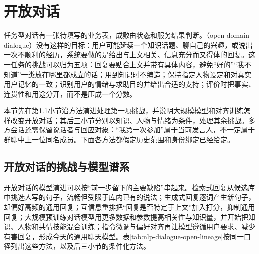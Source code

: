 \section{开放对话}
\label{sec:nlp-dialogue-open}

任务型对话有一张待填写的业务表，成败由状态和服务结果判断。（open-domain dialogue）没有这样的目标：用户可能延续一个知识话题、聊自己的兴趣，或说出一次不顺利的经历，系统要做的是给出与上文相关、信息充分而又得体的回复。这一任务的挑战可以归为五项：回复要贴合上文并带有具体内容，避免“好的”“我不知道”一类放在哪里都成立的话；用到知识时不编造；保持指定人物设定和对真实用户记忆的一致；识别用户的情绪与求助目的并给出合适的支持；评价时把事实、连贯性和用途分开，而不是压成一个分数。

本节先在第\ref{sec:nlp-dialogue-open-lineage}小节沿方法演进处理第一项挑战，并说明大规模模型和对齐训练怎样改变开放对话；其后三小节分别以知识、人物与情绪为条件，处理其余挑战。多方会话还需保留说话者与回应对象：“我第一次参加”属于当前发言人，不一定属于群聊中上一位同名成员。下面各方法都假定历史范围和身份绑定已经给定。

\subsection{开放对话的挑战与模型谱系}
\label{sec:nlp-dialogue-open-lineage}

开放对话的模型演进可以按“前一步留下的主要缺陷”串起来。检索式回复从候选库中挑选人写的句子，流畅但受限于库内已有的说法；生成式回复逐词产生新句子，却偏好高频的通用回复；互信息重排把“回复是否特定于上文”加入打分，抑制通用回复；大规模预训练对话模型用更多数据和参数提高相关性与知识量，并开始把知识、人物和共情技能混合训练；指令微调与偏好对齐再让模型遵循用户要求、减少有害回复，形成今天的通用聊天模型。表\ref{tab:nlp-dialogue-open-lineage}按同一口径列出这些方法，以及后三小节的条件化方法。

